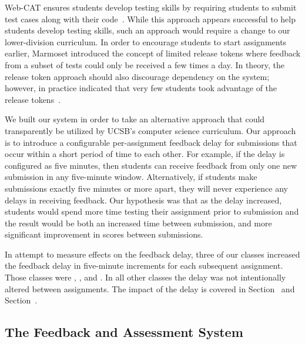Web-CAT ensures students develop testing skills by requiring students to submit
test cases along with their code~\cite{Edwards:2003:RCS:949344.949390}. While
this approach appears successful to help students develop testing skills, such
an approach would require a change to our lower-division curriculum. In order
to encourage students to start assignments earlier, Marmoset introduced the
concept of limited release tokens where feedback from a subset of tests could
only be received a few times a day. In theory, the release token approach
should also discourage dependency on the system; however, in practice \spacco{}
indicated that very few students took advantage of the release
tokens~\cite{Spacco:2013:TIP:2462476.2465594}.

We built our system in order to take an alternative approach that could
transparently be utilized by UCSB's computer science curriculum. Our approach
is to introduce a configurable per-assignment feedback delay for submissions
that occur within a short period of time to each other. For example, if the
delay is configured as five minutes, then students can receive feedback from
only one new submission in any five-minute window. Alternatively, if students
make submissions exactly five minutes or more apart, they will never experience
any delays in receiving feedback. Our hypothesis was that as the delay
increased, students would spend more time testing their assignment prior to
submission and the result would be both an increased time between submission,
and more significant improvement in scores between submissions.

In attempt to measure effects on the feedback delay, three of our classes
increased the feedback delay in five-minute increments for each subsequent
assignment. Those classes were , , and . In
all other classes the delay was not intentionally altered between
assignments. The impact of the delay is covered in
Section~ and Section~.


\subsection{The Feedback and Assessment System}

